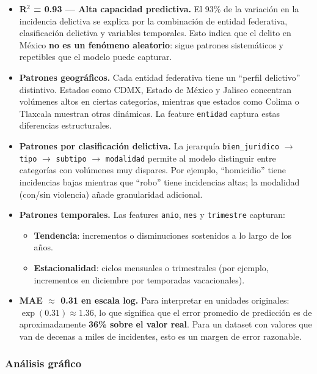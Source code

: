 \begin{itemize}

\item \textbf{R$^2$ = 0.93 --- Alta capacidad predictiva.} El 93\% de la variación en la incidencia delictiva se explica por
la combinación de entidad federativa, clasificación delictiva y variables temporales. Esto indica que el
delito en México \textbf{no es un fenómeno aleatorio}: sigue patrones sistemáticos y repetibles que el modelo
puede capturar.

\item \textbf{Patrones geográficos.} Cada entidad federativa tiene un ``perfil delictivo'' distintivo. Estados como
CDMX, Estado de México y Jalisco concentran volúmenes altos en ciertas categorías, mientras que estados
como Colima o Tlaxcala muestran otras dinámicas. La feature \texttt{entidad} captura estas diferencias estructurales.

\item \textbf{Patrones por clasificación delictiva.} La jerarquía \texttt{bien\_juridico} $\rightarrow$ \texttt{tipo} $\rightarrow$ \texttt{subtipo} $\rightarrow$ \texttt{modalidad} permite
al modelo distinguir entre categorías con volúmenes muy dispares. Por ejemplo, ``homicidio'' tiene incidencias
bajas mientras que ``robo'' tiene incidencias altas; la modalidad (con/sin violencia) añade granularidad
adicional.

\item \textbf{Patrones temporales.} Las features \texttt{anio}, \texttt{mes} y \texttt{trimestre} capturan:
    \begin{itemize}
    \item \textbf{Tendencia}: incrementos o disminuciones sostenidos a lo largo de los años.
    \item \textbf{Estacionalidad}: ciclos mensuales o trimestrales (por ejemplo, incrementos en diciembre por
    temporadas vacacionales).
    \end{itemize}

\item \textbf{MAE $\approx$ 0.31 en escala log.} Para interpretar en unidades originales: $\exp(0.31) \approx 1.36$, lo que significa
que el error promedio de predicción es de aproximadamente \textbf{36\% sobre el valor real}. Para un dataset con
valores que van de decenas a miles de incidentes, esto es un margen de error razonable.

\end{itemize}

\subsubsection{Análisis gráfico}

